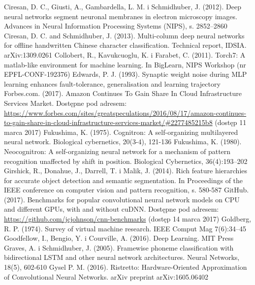 \documentclass[12pt,a4paper,twoside]{article}
\begin{document}
\begin{thebibliography}{99}
 Ciresan, D. C., Giusti, A., Gambardella, L. M. i Schmidhuber, J. (2012). Deep neural networks segment neuronal membranes in electron microscopy images. Advances in Neural Information Processing Systems (NIPS), s. 2852–2860
 Ciresan, D. C. and Schmidhuber, J. (2013). Multi-column deep neural networks for offline handwritten Chinese character classification. Technical report, IDSIA. arXiv:1309.0261
 Collobert, R., Kavukcuoglu, K. i Farabet, C. (2011). Torch7: A matlab-like environment for machine learning. In BigLearn, NIPS Workshop (nr EPFL-CONF-192376)
 Edwards, P. J. (1993). Synaptic weight noise during MLP learning enhances fault-tolerance, generalisation and learning trajectory
 Forbes.com. (2017). Amazon Continues To Gain Share In Cloud Infrastructure Services Market. Dostępne pod adresem: \url{https://www.forbes.com/sites/greatspeculations/2016/08/17/amazon-continues-to-gain-share-in-cloud-infrastructure-services-market/#2277485215b8} (dostęp 11 marca 2017)
 Fukushima, K. (1975). Cognitron: A self-organizing multilayered neural network. Biological cybernetics, 20(3-4), 121-136
 Fukushima, K. (1980). Neocognitron: A self-organizing neural network for a mechanism of pattern recognition unaffected by shift in position. Biological Cybernetics, 36(4):193–202
 Girshick, R., Donahue, J., Darrell, T. i Malik, J. (2014). Rich feature hierarchies for accurate object detection and semantic segmentation. In Proceedings of the IEEE conference on computer vision and pattern recognition, s. 580-587
 GitHub. (2017). Benchmarks for popular convolutional neural network models on CPU and different GPUs, with and without cuDNN. Dostępne pod adresem: \url{https://github.com/jcjohnson/cnn-benchmarks} (dostęp 14 marca 2017)
 Goldberg, R. P. (1974). Survey of virtual machine research. IEEE Comput Mag 7(6):34–45
 Goodfellow, I., Bengio, Y. i Courville, A. (2016). Deep Learning. MIT Press
 Graves, A. i Schmidhuber, J. (2005). Framewise phoneme classification with bidirectional LSTM and other neural network architectures. Neural Networks, 18(5), 602-610
 Gysel P. M. (2016). Ristretto: Hardware-Oriented Approximation of Convolutional Neural Networks. arXiv preprint arXiv:1605.06402

\end{thebibliography}
\end{document}
